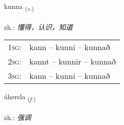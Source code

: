 \documentclass[frontgrid, backgrid]{flacards}\usepackage[]{graphicx}\usepackage[]{xcolor}
\begin{document}
\renewcommand{\flhead}{\vskip5pt \fboxsep=0pt {\small\bfseries\footnotesize Sagnorð | 动词}}
\renewcommand{\fcfoot}{\vskip5pt \fboxsep=0pt \hspace{2pt}{\small\bfseries\footnotesize 1K}}

\renewcommand{\blhead}{\vskip5pt {\small\bfseries\footnotesize Sagnorð | 动词 }}
\renewcommand{\bcfoot}{\vskip5pt \hspace{2pt}{\small\bfseries\footnotesize 1K}}


{kunna \small{\textsubscript{(\textit{v.})}} \\[1ex] %
\textphonetic{[kʰʏna]} \\
zh.: \emph{懂得，认识，知道} \\  [2ex]
\renewcommand*{\arraystretch}{0.8}
\begin{tabular}{p{1cm}l}
\textsc{1sg}: & kann -- kunni -- kunnað \\ 
\textsc{2sg}: & kannt -- kunnir -- kunnað \\ 
\textsc{3sg}: & kann -- kunni -- kunnað \\ 
\end{tabular}
}

\renewcommand{\flhead}{\vskip5pt \fboxsep=0pt {\small\bfseries\footnotesize Nafnorð | 名词}}
\renewcommand{\fcfoot}{\vskip5pt \fboxsep=0pt \hspace{2pt}{\small\bfseries\footnotesize 1K}}

\renewcommand{\blhead}{\vskip5pt {\small\bfseries\footnotesize Nafnorð | 名词 }}
\renewcommand{\bcfoot}{\vskip5pt \hspace{2pt}{\small\bfseries\footnotesize 1K}}


{áhersla \small{\textsubscript{(\textit{f.})}} \\[1ex] %
 \\
zh.: \emph{强调} \\  [2ex]
\renewcommand*{\arraystretch}{0.8}
}
\end{document}
